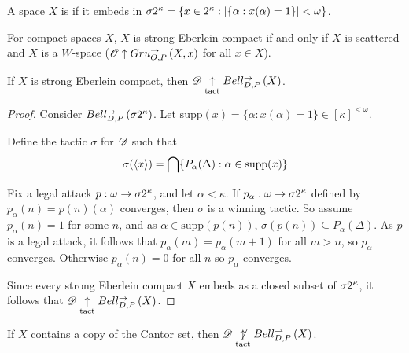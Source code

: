 \documentclass[11pt]{article}
\begin{document}
  \begin{definition}
    A space $X$ is  if it embeds in
    $\sigma2^{\kappa}=\{x\in2^\kappa:|\{\alpha:x(\alpha)=1\}|<\omega\}$.
  \end{definition}

  \begin{theorem}[Gruenhage]
    For compact spaces $X$,
    $X$ is strong Eberlein compact if and only if
    $X$ is scattered and $X$ is a $W$-space
    ($\mathscr{O}\uparrow Gru_{O,P}^{\to}\left({X},{x}\right)$ for all $x\in X$).
  \end{theorem}

  \begin{theorem}
    If $X$ is strong Eberlein compact, then
    $\mathscr{D}\underset{\text{tact}}{\uparrow}Bell_{D,P}^{\to}\left({X}\right)$.
  \end{theorem}

  \begin{proof}
    Consider $Bell_{D,P}^{\to}\left({\sigma2^{\kappa}}\right)$. Let
    $\text{supp}(x)=\{\alpha:x(\alpha)=1\}\in[\kappa]^{<\omega}$.

    Define the tactic $\sigma$ for $\mathscr{D}$ such that
      \[
        \sigma(\langle x\rangle)
          =
        \bigcap\{
          P_\alpha(\Delta) : \alpha\in\text{supp}(x)
        \}
      \]

    Fix a legal attack $p:\omega\to\sigma2^{\kappa}$, and let
    $\alpha<\kappa$. If $p_\alpha:\omega\to\sigma2^{\kappa}$ defined by
    $p_\alpha(n)=p(n)(\alpha)$ converges, then $\sigma$ is a winning
    tactic. So assume
    $p_\alpha(n)=1$ for some $n$, and as $\alpha\in\text{supp}(p(n))$,
    $\sigma(p(n))\subseteq P_\alpha(\Delta)$. As $p$ is a legal attack,
    it follows that $p_\alpha(m)=p_\alpha(m+1)$ for all $m>n$, so
    $p_\alpha$ converges. Otherwise $p_\alpha(n)=0$ for all $n$ so
    $p_\alpha$ converges.

    Since every strong Eberlein compact $X$ embeds as a closed subset of
    $\sigma2^{\kappa}$, it follows that $\mathscr{D}\underset{\text{tact}}{\uparrow}Bell_{D,P}^{\to}\left({X}\right)$.
  \end{proof}

  \begin{theorem}\label{cantorCopy}
    If $X$ contains a copy of the Cantor set, then
    $\mathscr{D}\underset{\text{tact}}{\not\uparrow}Bell_{D,P}^{\rightharpoonup}\left({X}\right)$.
  \end{theorem}
\end{document}
